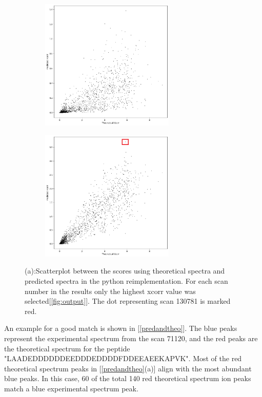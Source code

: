 \documentclass[11pt]{article}
\begin{document}
\begin{figure}
\centering
\begin{subfigure}[b]{1\textwidth}
    \centering
    \includegraphics[width=0.7\textwidth]{figs/scatterplot_predicted_theoretical.png}
   \caption{}
   \label{fig:scatterplot_predicted_theoretical} 
\end{subfigure}
\begin{subfigure}[b]{1\textwidth}
    \centering
   \includegraphics[width=0.7\textwidth]{figs/scatterplot_windows.png}
   \caption{}
   \label{fig:scatterplot_windows}
\end{subfigure}
\caption{(a):Scatterplot between the scores using theoretical spectra and predicted spectra in the python reimplementation. For each scan number in the results only the highest xcorr value was selected[\cref{fig:output}]. The dot representing scan 130781 is marked red.}
\label{scatterplot_python}
\end{figure}
An example for a good match is shown in [\cref{predandtheo}]. %
The blue peaks represent the experimental spectrum from the scan 71120, and the red peaks are the theoretical spectrum for the peptide "LAADEDDDDDDEEDDDEDDDDFDDEEAEEKAPVK". Most of the red theoretical spectrum peaks in [\cref{predandtheo}(a)] align with the most abundant blue peaks. In this case, 60 of the total 140 red theoretical spectrum ion peaks match a blue experimental spectrum peak. 
\end{document}
